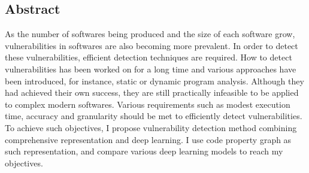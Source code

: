 \subsection*{Abstract}

As the number of softwares being produced and the size of each software grow, vulnerabilities in softwares are also becoming more prevalent.
In order to detect these vulnerabilities, efficient detection techniques are required.
How to detect vulnerabilities has been worked on for a long time and various approaches have been introduced, for instance, static or dynamic program analysis.
Although they had achieved their own success, they are still practically infeasible to be applied to complex modern softwares.
Various requirements such as modest execution time, accuracy and granularity should be met to efficiently detect vulnerabilities.
To achieve such objectives, I propose vulnerability detection method combining comprehensive representation and deep learning.
I use code property graph as such representation, and compare various deep learning models to reach my objectives.